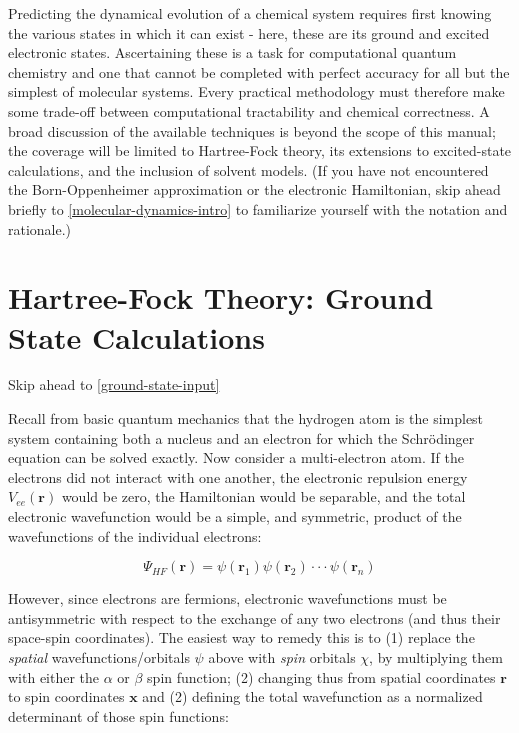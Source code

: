 \documentclass[12pt,letter,footinclude=true,headinclude=true,hyphens,oneside]{book} %
\begin{document}
    Predicting the dynamical evolution of a chemical system requires first knowing the various states in which it can exist - here, these are its ground and excited electronic states. Ascertaining these is a task for computational quantum chemistry and one that cannot be completed with perfect accuracy for all but the simplest of molecular systems. Every practical methodology must therefore make some trade-off between computational tractability and chemical correctness. A broad discussion of the available techniques is beyond the scope of this manual; the coverage will be limited to Hartree-Fock theory, its extensions to excited-state calculations, and the inclusion of solvent models. (If you have not encountered the Born-Oppenheimer approximation or the electronic Hamiltonian, skip ahead briefly to \ref{molecular-dynamics-intro} to familiarize yourself with the notation and rationale.)
    
    \section{Hartree-Fock Theory: Ground State Calculations}
    
    Skip ahead to \ref{ground-state-input}
    
    Recall from basic quantum mechanics that the hydrogen atom is the simplest system containing both a nucleus and an electron for which the Schr\"{o}dinger equation can be solved exactly. Now consider a multi-electron atom. If the electrons did not interact with one another, the electronic repulsion energy $V_{ee}(\mathbf{r})$ would be zero, the Hamiltonian would be separable, and the total electronic wavefunction would be a simple, and symmetric, product of the wavefunctions of the individual electrons:
    
    \begin{equation}
    \Psi_{HF}(\mathbf{r}) = \psi(\mathbf{r}_1)\psi(\mathbf{r}_2) \cdot \cdot \cdot \psi(\mathbf{r}_n)
    \end{equation}
    
    However, since electrons are fermions, electronic wavefunctions must be antisymmetric with respect to the exchange of any two electrons (and thus their space-spin coordinates). The easiest way to remedy this is to (1) replace the \emph{spatial} wavefunctions/orbitals $\psi$ above with \emph{spin} orbitals $\chi$, by multiplying them with either the $\alpha$ or $\beta$ spin function; (2) changing thus from spatial coordinates $\mathbf{r}$ to spin coordinates $\mathbf{x}$ and (2) defining the total wavefunction as a normalized determinant of those spin functions:
    
\end{document}
